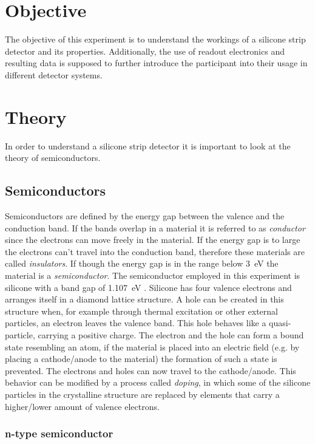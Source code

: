 \section{Objective}
\label{sec:Obj}
The objective of this experiment is to understand the workings of a silicone strip detector and its properties. Additionally, the use of readout electronics and resulting data is supposed to further introduce the participant into their usage in different detector systems.
\section{Theory}
\label{sec:Theo}

In order to understand a silicone strip detector it is important to look at the theory of semiconductors.
\subsection{Semiconductors}
Semiconductors are defined by the energy gap between the valence and the conduction band. If the bands overlap in a material it is referred to as \textit{conductor} since the electrons can move freely in the material. If the energy gap is to large the electrons can't travel into the conduction band, therefore these materials are called \textit{insulators}. If though the energy gap is in the range below \qty{3}{\eV} the material is a \textit{semiconductor}. The semiconductor employed in this experiment is silicone with a band gap of \qty{1.107}{\eV} \cite{V15}. Silicone has four valence electrons and arranges itself in a diamond lattice structure. A hole can be created in this structure when, for example through thermal excitation or other external particles, an electron leaves the valence band. This hole behaves like a quasi-particle, carrying a positive charge. The electron and the hole can form a bound state resembling an atom, if the material is placed into an electric field (e.g. by placing a cathode/anode to the material) the formation of such a state is prevented. The electrons and holes can now travel to the cathode/anode. This behavior can be modified by a process called \textit{doping}, in which some of the silicone particles in the crystalline structure are replaced by elements that carry a higher/lower amount of valence electrons. %

\subsubsection{n-type semiconductor}

